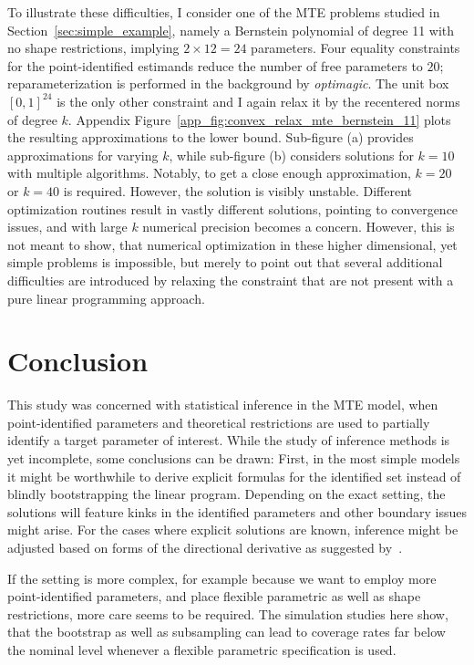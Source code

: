 \documentclass[12pt,a4paper,english]{article} %
\numberwithin{equation}{section}
\theoremstyle{definition}
\theoremstyle{remark}
\theoremstyle{plain}
\begin{document}
To illustrate these difficulties, I consider one of the MTE problems studied in Section~\ref{sec:simple_example}, namely a Bernstein polynomial of degree 11 with no shape restrictions, implying $2\times12=24$ parameters.
Four equality constraints for the point-identified estimands reduce the number of free parameters to $20$; reparameterization is performed in the background by \textit{optimagic}.
The unit box $[0,1]^{24}$ is the only other constraint and I again relax it by the recentered norms of degree $k$.
Appendix Figure~\ref{app_fig:convex_relax_mte_bernstein_11} plots the resulting approximations to the lower bound.
Sub-figure (a) provides approximations for varying $k$, while sub-figure (b) considers solutions for $k=10$ with multiple algorithms.
Notably, to get a close enough approximation, $k=20$ or $k=40$ is required. However, the solution is visibly unstable.
Different optimization routines result in vastly different solutions, pointing to convergence issues, and with large $k$ numerical precision becomes a concern.
However, this is not meant to show, that numerical optimization in these higher dimensional, yet simple problems is impossible, but merely to point out that several additional difficulties are introduced by relaxing the constraint that are not present with a pure linear programming approach.


\section{Conclusion}
This study was concerned with statistical inference in the MTE model, when point-identified parameters and theoretical restrictions are used to partially identify a target parameter of interest.
While the study of inference methods is yet incomplete, some conclusions can be drawn:
First, in the most simple models it might be worthwhile to derive explicit formulas for the identified set instead of blindly bootstrapping the linear program.
Depending on the exact setting, the solutions will feature kinks in the identified parameters and other boundary issues might arise.
For the cases where explicit solutions are known, inference might be adjusted based on forms of the directional derivative as suggested by~\cite{fang2019infdirdiff}.

If the setting is more complex, for example because we want to employ more point-identified parameters, and place flexible parametric as well as shape restrictions, more care seems to be required.
The simulation studies here show, that the bootstrap as well as subsampling can lead to coverage rates far below the nominal level whenever a flexible parametric specification is used.
\end{document}
